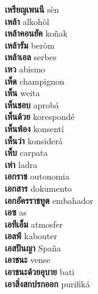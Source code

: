 \textbf{ เหรียญเพนนี  } sèn \\
\textbf{ เหล้า  } alkohòl \\
\textbf{ เหล้าคอนยัค  } koñak \\
\textbf{ เหล้ารัม  } beròm \\
\textbf{ เหล้าเอล  } serbes \\
\textbf{ เหว  } abismo \\
\textbf{ เห็ด  } champignon \\
\textbf{ เห็น  } weita \\
\textbf{ เห็นชอบ  } aprobá \\
\textbf{ เห็นด้วย  } korespondé \\
\textbf{ เห็นพ้อง  } konsentí \\
\textbf{ เห็นว่า  } konsiderá \\
\textbf{ เห็บ  } carpata \\
\textbf{ เห่า  } ladra \\
\textbf{ เอกราช  } outonomia \\
\textbf{ เอกสาร  } dokumento \\
\textbf{ เอกอัครราชทูต  } embahador \\
\textbf{ เอซ  } as \\
\textbf{ เอทีเอ็ม  } atmosfer \\
\textbf{ เอลฟ์  } kabouter \\
\textbf{ เอสปันญา  } Spaña \\
\textbf{ เอาชนะ  } vense \\
\textbf{ เอาชนะด้วยอุบาย  } bati \\
\textbf{ เอาสิ่งสกปรกออก  } purifiká \\
